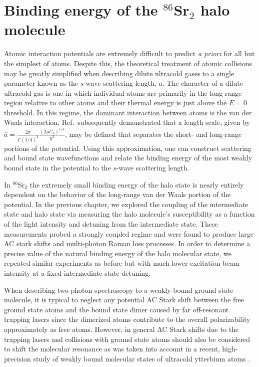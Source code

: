 \chapter{Binding energy of the $^{86}$Sr$_2$ halo molecule} \label{ch:chap5}
Atomic interaction potentials are extremely difficult to predict \textit{a priori} for all but the simplest of atoms.
Despite this, the theoretical treatment of atomic collisions may be greatly simplified when describing dilute ultracold gases to a single parameter known as the $s$-wave scattering length, $a$.
The character of a dilute ultracold gas is one in which individual atoms are primarily in the long-range region relative to other atoms and their thermal energy is just above the $E=0$ threshold. 
In this regime, the dominant interaction between atoms is the van der Waals interaction.
Ref.\,\hl{\cite{gfl93}} subsequently demonstrated that a length scale, given by $\bar{a}=\frac{2 \pi}{\Gamma(1/4)^2} \frac{(2 \mu C_6)^{1/4}}{\hbar^2}$, may be defined that separates the short- and long-range portions of the potential.
Using this approximation, one can construct scattering and bound state wavefunctions and relate the binding energy of the most weakly bound state in the potential to the $s$-wave scattering length.

In $^{86}$Sr$_2$ the extremely small binding energy of the halo state is nearly entirely dependent on the behavior of the long-range van der Waals portion of the potential.
In the previous chapter, we explored the coupling of the intermediate state and halo state via measuring the halo molecule's susceptibility as a function of the light intensity and detuning from the intermediate state.
These measurements probed a strongly coupled regime and were found to produce large AC stark shifts and multi-photon Raman loss processes. 
In order to determine a precise value of the natural binding energy of the halo molecular state, we repeated similar experiments as before but with much lower excitation beam intensity at a fixed intermediate state detuning.

When describing two-photon spectroscopy to a weakly-bound ground state molecule, it is typical to neglect any potential AC Stark shift between the free ground state atoms and the bound state dimer caused by far off-resonant trapping lasers since the dimerized atoms contribute to the overall polarizability approximately as free atoms.
However, in general AC Stark shifts due to the trapping lasers and collisions with ground state atoms should also be considered to shift the molecular resonance as was taken into account in a recent, high-precision study of weakly bound molecular states of ultracold ytterbium atoms \hl{\cite{bbc17}}.


